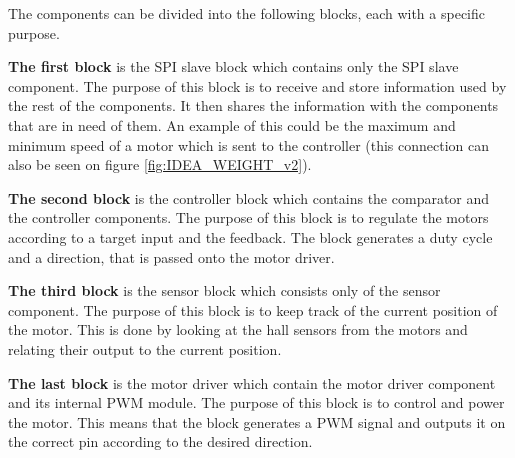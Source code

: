 The components can be divided into the following blocks, each with a specific purpose. 

\textbf{The first block} is the SPI slave block which contains only the SPI slave component. The purpose of this block is to receive and store information used by the rest of the components. It then shares the information with the components that are in need of them. An example of this could be the maximum and minimum speed of a motor which is sent to the controller (this connection can also be seen on figure \ref{fig:IDEA_WEIGHT_v2}).

\textbf{The second block} is the controller block which contains the comparator and the controller components. The purpose of this block is to regulate the motors according to a target input and the feedback. The block generates a duty cycle and a direction, that is passed onto the motor driver.

\textbf{The third block} is the sensor block which consists only of the sensor component. The purpose of this block is to keep track of the current position of the motor. This is done by looking at the hall sensors from the motors and relating their output to the current position.

\textbf{The last block} is the motor driver which contain the motor driver component and its internal PWM module. The purpose of this block is to control and power the motor. This means that the block generates a PWM signal and outputs it on the correct pin according to the desired direction.

